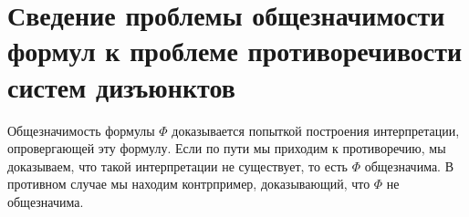 \section{Сведение проблемы общезначимости формул к проблеме противоречивости систем дизъюнктов}
Общезначимость формулы $\Phi$ доказывается попыткой построения интерпретации, опровергающей эту формулу. Если по пути мы приходим к противоречию, мы доказываем, что такой интерпретации не существует, то есть $\Phi$ общезначима. В противном случае мы находим контрпример, доказывающий, что $\Phi$ не общезначима.